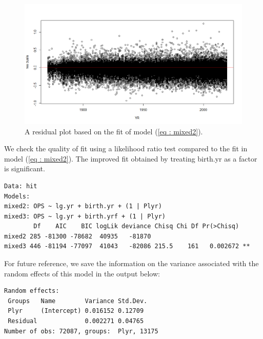 \documentclass [52pt] {article}
\begin{document}
\begin{figure}[h!]
\centering
\includegraphics[scale = 0.5]{mixed3res.png}
\caption{\label{fig : mixed3res} A residual plot based on the fit of model (\ref{eq : mixed2}).}
\end{figure}
We check the quality of fit using a likelihood ratio test compared to the fit in model (\ref{eq : mixed2}).  The improved fit obtained by treating birth.yr as a factor is significant.
\begin{verbatim}
Data: hit
Models:
mixed2: OPS ~ lg.yr + birth.yr + (1 | Plyr)
mixed3: OPS ~ lg.yr + birth.yrf + (1 | Plyr)
        Df    AIC    BIC logLik deviance Chisq Chi Df Pr(>Chisq)   
mixed2 285 -81300 -78682  40935   -81870                           
mixed3 446 -81194 -77097  41043   -82086 215.5    161   0.002672 **
\end{verbatim}

For future reference, we save the information on the variance associated with the random effects of this model in the output below:
\begin{verbatim}
Random effects:
 Groups   Name        Variance Std.Dev.
 Plyr     (Intercept) 0.016152 0.12709 
 Residual             0.002271 0.04765 
Number of obs: 72087, groups:  Plyr, 13175
\end{verbatim}
\end{document}
